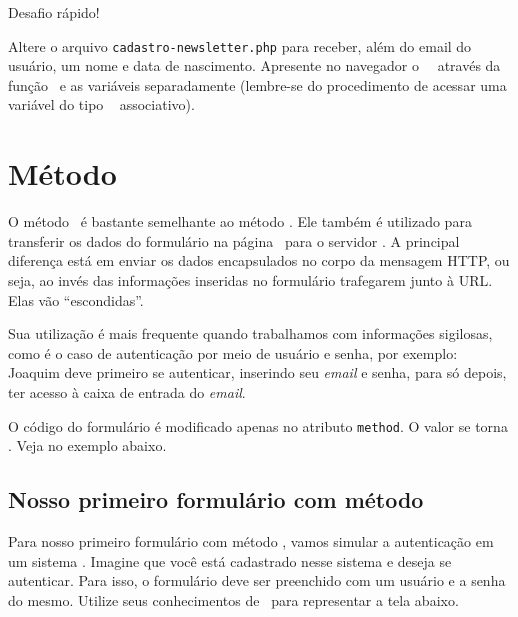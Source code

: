 \begin{framed}
{\Large Desafio rápido!}

Altere o arquivo \texttt{cadastro-newsletter.php} para receber, além do email do 
usuário, um nome e data de nascimento. Apresente no navegador  
o \tipoarray~\variavelget~através da função \funcaoprintr~e as variáveis
separadamente (lembre-se do procedimento de acessar uma variável do tipo \tipoarray~
associativo).
\end{framed}

\section{Método \metodoPOST}
\label{metodo-post}

O método \metodoPOST~é bastante semelhante ao método \metodoGET. Ele também é utilizado
para transferir os dados do formulário na página \html~para o servidor \php. A principal
diferença está em enviar os dados encapsulados no corpo da mensagem HTTP, ou seja,
ao invés das informações inseridas no formulário trafegarem junto à URL. Elas vão
``escondidas''. 

Sua utilização é mais frequente quando trabalhamos com informações sigilosas, como é o caso
de autenticação por meio de usuário e senha, por exemplo: Joaquim deve primeiro se autenticar,
inserindo seu \textit{email} e senha, para só depois, ter acesso à caixa de entrada do \textit{email}.

O código do formulário é modificado apenas no atributo \texttt{method}. O valor se torna
\metodoPOST. Veja no exemplo abaixo.



\subsection{Nosso primeiro formulário com método \metodoPOST}
\label{nosso-primeiro-formulario-com-metodo-post}

Para nosso primeiro formulário com método \metodoPOST, vamos simular a autenticação em um 
sistema \web. Imagine que você está cadastrado nesse sistema e deseja se autenticar. 
Para isso, o formulário deve ser preenchido com um usuário e a senha do mesmo.
Utilize seus conhecimentos de \html~para representar a tela abaixo.


